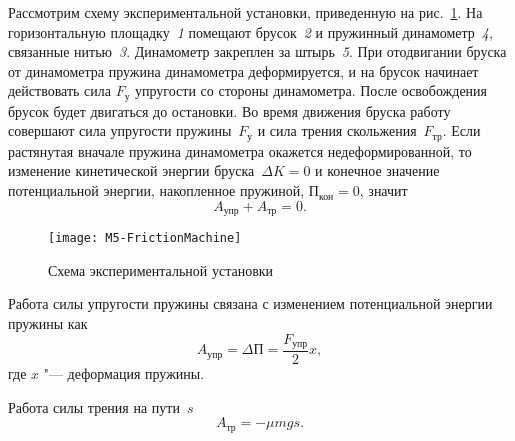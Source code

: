 \documentclass[a4paper, 12pt]{extarticle}
\begin{document}
Рассмотрим схему экспериментальной установки, приведенную на рис.~\ref{fig:m5-equipment}. На горизонтальную площадку~\emph{1} помещают брусок~\emph{2} и пружинный динамометр~\emph{4}, связанные нитью~\emph{3}. Динамометр закреплен за штырь~\emph{5}. При отодвигании бруска от динамометра пружина динамометра деформируется, и на брусок начинает действовать сила $F_\text{у}$ упругости со стороны динамометра. %
После освобождения брусок будет двигаться до остановки. Во время движения бруска работу совершают сила упругости пружины~$F_\text{у}$ и сила трения скольжения~$F_\text{тр}$. Если растянутая вначале пружина динамометра окажется недеформированной, то изменение кинетической энергии бруска~$\Delta K = 0$ и конечное значение потенциальной энергии, накопленное пружиной, $\text{П}_\text{кон} = 0$, значит %
\begin{equation}
\label{eq:m5-law-of-conservation}
A_\text{упр} + A_\text{тр} = 0.
\end{equation}

\begin{figure}[h]
\begin{center}
\texttt{[image: M5-FrictionMachine]}
\end{center}
\caption{Схема экспериментальной установки \label{fig:m5-equipment}}
\end{figure} 

Работа силы упругости пружины связана с изменением потенциальной энергии пружины как
\begin{equation}
\label{eq:m5-work-of-elastic-force}
A_\text{упр} = \Delta \text{П} = \frac{F_\text{упр}}{2} x,
\end{equation}
где $x$ "--- деформация пружины.

Работа силы трения на пути~$s$ %
\begin{equation}
\label{eq:m5-work-of-frictional-force}
A_\text{тр} = -\mu m g s.
\end{equation}
\end{document}

